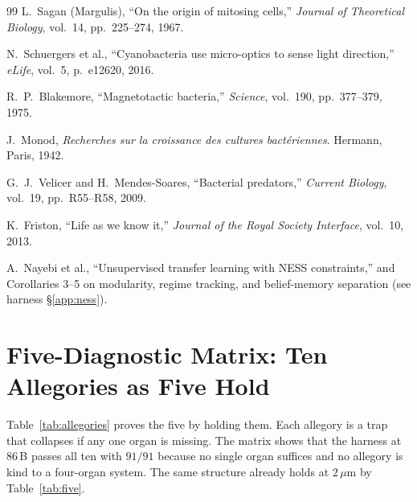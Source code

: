 \documentclass[12pt,a4paper]{article}
\begin{document}
\begin{thebibliography}{99}
L.~Sagan (Margulis), ``On the origin of mitosing cells,'' \emph{Journal of Theoretical Biology}, vol.~14, pp.~225--274, 1967.

N.~Schuergers et al., ``Cyanobacteria use micro-optics to sense light direction,'' \emph{eLife}, vol.~5, p.~e12620, 2016.

R.~P.~Blakemore, ``Magnetotactic bacteria,'' \emph{Science}, vol.~190, pp.~377--379, 1975.

J.~Monod, \emph{Recherches sur la croissance des cultures bact\'{e}riennes}. Hermann, Paris, 1942.

G.~J.~Velicer and H.~Mendes-Soares, ``Bacterial predators,'' \emph{Current Biology}, vol.~19, pp.~R55--R58, 2009.

K.~Friston, ``Life as we know it,'' \emph{Journal of the Royal Society Interface}, vol.~10, 2013.

A.~Nayebi et al., ``Unsupervised transfer learning with NESS constraints,'' and Corollaries 3--5 on modularity, regime tracking, and belief-memory separation (see harness \S\ref{app:ness}).

\end{thebibliography}

\appendix

\section{Five-Diagnostic Matrix: Ten Allegories as Five Hold}
\label{app:diagnostic}

Table~\ref{tab:allegories} proves the five by holding them. Each allegory is a trap that collapses if any one organ is missing. The matrix shows that the harness at $86$\,B passes all ten with $91/91$ because no single organ suffices and no allegory is kind to a four-organ system. The same structure already holds at $2\,\mu\mathrm{m}$ by Table~\ref{tab:five}.
\end{document}
